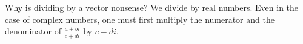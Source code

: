 {Why is dividing by a vector nonsense?
}
{
We divide by real numbers.  Even in the case of complex numbers, one must first multiply the numerator and the denominator of $\frac{a+bi}{c+di}$ by $c-di$.  
}